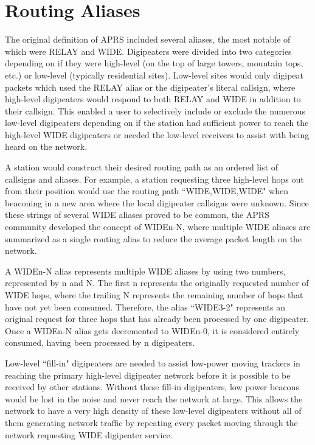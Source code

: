 \section{Routing Aliases}

The original definition of APRS included several aliases,
the most notable of which were RELAY and WIDE.
Digipeaters were divided into two categories depending on if they were high-level
(on the top of large towers, mountain tops, etc.)
or low-level (typically residential sites).
Low-level sites would only digipeat packets which used the RELAY alias
or the digipeater's literal callsign,
where high-level digipeaters would respond to both RELAY and WIDE in addition
to their callsign.
This enabled a user to selectively include or exclude the numerous low-level
digipeaters depending on if the station had sufficient power to
reach the high-level WIDE digipeaters or needed the low-level receivers
to assist with being heard on the network.

A station would construct their desired routing path as an ordered list
of callsigns and aliases.
For example, a station requesting three high-level hops out from their position
would use the routing path ``WIDE,WIDE,WIDE" when beaconing in a new area where
the local digipeater callsigns were unknown.
Since these strings of several WIDE aliases proved to be common,
the APRS community developed the concept of WIDEn-N, where multiple
WIDE aliases are summarized as a single routing alias to reduce the average
packet length on the network.

A WIDEn-N alias represents multiple WIDE aliases by using two numbers,
represented by n and N.
The first n represents the originally requested number of WIDE hops,
where the trailing N represents the remaining number of hops that have not yet
been consumed.
Therefore, the alias ``WIDE3-2" represents an original request for three hops
that has already been processed by one digipeater.
Once a WIDEn-N alias gets decremented to WIDEn-0, it is considered entirely
consumed, having been processed by n digipeaters.

Low-level ``fill-in" digipeaters are needed to assist low-power 
moving trackers in reaching the primary high-level digipeater network
before it is possible to be received by other stations.
Without these fill-in digipeaters, 
low power beacons would be lost in the noise and never reach the network at large.
This allows the network to have a very high density of these low-level
digipeaters without all of them generating network traffic by repeating every
packet moving through the network requesting WIDE digipeater service.

